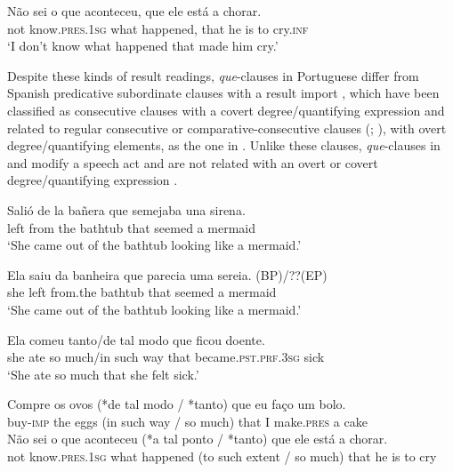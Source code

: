 \documentclass[output=paper,colorlinks,citecolor=brown,
]{langscibook}
\begin{document}
\ea \label{ex:matos:nao-sei}
\gll Não sei {o que} aconteceu, que ele está a chorar.\\
	not know.\textsc{pres}.\textsc{1sg} what happened, that he is to cry.\textsc{inf}\\
\glt ‘I don’t know what happened that made him cry.’
\z 
 
Despite these kinds of result readings, \textit{que}-clauses in Portuguese  differ from Spanish predicative subordinate clauses with a result import , which have been classified as consecutive clauses with a covert degree/quantifying expression \citep{demonte_predicacion_1999} and related to regular consecutive or comparative-consecutive clauses (\citealt{giusti_frasi_1991}; \citealt{corver_internal_1997}), with overt degree/quantifying elements, as the one in . Unlike these clauses, \textit{que}-clauses in  and  modify a speech act and are not related with an overt or covert degree/quantifying expression .

\ea \label{ex:matos:salio}
\gll Salió de la bañera que semejaba una sirena. \\
     left from the bathtub that seemed a mermaid\\
\glt ‘She came out of the bathtub looking like a mermaid.’

\citep[2473]{demonte_predicacion_1999}
\z 

\ea \label{ex:matos:sereia}
\gll Ela saiu da banheira que parecia uma sereia. (BP)/??(EP){\footnotemark}\\
     she left from.the bathtub that seemed a mermaid\\
\glt ‘She came out of the bathtub looking like a mermaid.’
\z 

\ea \label{ex:matos:comeu-tanto}
\gll Ela comeu tanto/de tal modo que ficou doente.\\
	 she ate {so much}/in such way that became.\textsc{pst}.\textsc{prf}.\textsc{3sg} sick\\ 
\glt ‘She ate so much that she felt sick.’
\z 

\ea \label{ex:matos:ovos6}
 \ea \label{ex:matos:ovos6-talmodo}
 \gll Compre os ovos (*de tal modo / *tanto) que eu faço um bolo.\\
      buy-\textsc{imp} the eggs (in such way / {so much})  that I  make.\textsc{pres} a cake\\
 \ex \label{ex:matos:nao-sei-talponto}
 \gll Não sei {o que} aconteceu (*a tal ponto / *tanto) que ele está a        chorar.\\  
      not know.\textsc{pres}.\textsc{1sg} what happened (to such extent / {so much}) that he is to cry\\ 
 \z
\z 
\end{document}
